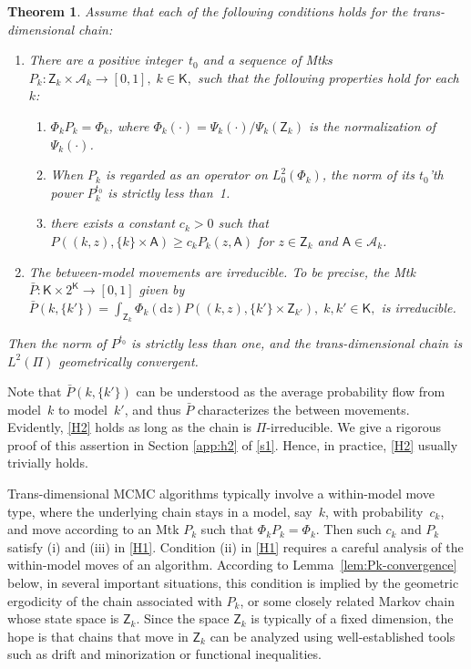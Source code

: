 \documentclass[12pt]{article}
\makeatletter
\def\namedlabel#1#2{\begingroup
	#2%
	\def\@currentlabel{#2}%
	\phantomsection\label{#1}\endgroup
}
\newcommand{\df}{\mathrm{d}}
\newcommand{\Z}{\mathsf{Z}}
\newcommand{\A}{\mathcal{A}}
\newtheorem{theorem}{Theorem}
\makeatother
\begin{document}
\begin{theorem} \label{thm:main}
	Assume that each of the following conditions holds for the trans-dimensional chain:
	\begin{enumerate} 
		\item [\namedlabel{H1}{(H1)}] There are a positive integer~$t_0$ and a sequence of Mtks $P_k: \Z_k \times \A_k \to [0,1], \; k \in \mathsf{K},$ such that the following properties hold for each~$k$:
		\begin{enumerate}
			\item [(i)] $\Phi_k P_k = \Phi_k$, where $\Phi_k(\cdot) = \Psi_k(\cdot)/\Psi_k(\Z_k)$ is the normalization of $\Psi_k(\cdot)$.
			\item [(ii)] When $P_k$ is regarded as an operator on $L_0^2(\Phi_k)$, the norm of its $t_0$'th power $P_k^{t_0}$ is strictly less than~1.
			\item [(iii)] there exists a constant $c_k > 0$ such that 
			$
			P((k,z), \{k\} \times \mathsf{A}) \geq c_k P_k(z, \mathsf{A})
			$ for $z \in \Z_k$ and $\mathsf{A} \in \A_k$.
		\end{enumerate} 
		
		\item [\namedlabel{H2}{(H2)}] 
		{ The between-model movements are irreducible.
		To be precise, the Mtk $\bar{P}: \mathsf{K} \times 2^{\mathsf{K}} \to [0,1]$ given by $
			\bar{P}(k,\{k'\}) = \int_{\Z_k} \Phi_k(\df z) P((k,z) , \{k'\} \times \Z_{k'}), \; k, k' \in \mathsf{K},
			$
		is irreducible.}
	\end{enumerate}
	Then the norm of $P^{t_0}$ is strictly less than one, and the trans-dimensional chain is $L^2(\Pi)$ geometrically convergent.
\end{theorem}


Note that $\bar{P}(k,\{k'\})$ can be understood as the average probability flow from model~$k$ to model~$k'$, and thus $\bar{P}$ characterizes the between movements.
{ Evidently, \ref{H2} holds as long as the chain is $\Pi$-irreducible.
We give a rigorous proof of this assertion in Section \ref{app:h2} of \ref{s1}.}
Hence, in practice, \ref{H2} usually trivially holds.




Trans-dimensional MCMC algorithms typically involve a within-model move type, where the underlying chain stays in a model, say~$k$, with probability~$c_k$, and move according to an Mtk $P_k$ such that $\Phi_k P_k = \Phi_k$.
Then such $c_k$ and $P_k$ satisfy (i) and (iii) in \ref{H1}.
Condition (ii) in \ref{H1} requires a careful analysis of the within-model moves of an algorithm.
According to Lemma~\ref{lem:Pk-convergence} below, in several important situations, this condition is implied by the geometric ergodicity of the chain associated with $P_k$, or some closely related Markov chain whose state space is $\Z_k$.
Since the space $\Z_k$ is typically of a fixed dimension, the hope is that chains that move in $\Z_k$ can be analyzed using well-established tools such as drift and minorization or functional inequalities.
\end{document}
